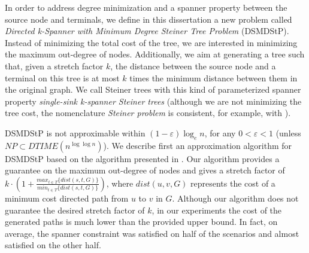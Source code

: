 In order to address degree minimization and a spanner property between the source node and terminals, we define in this dissertation a new problem called
\emph{Directed k-Spanner with Minimum Degree Steiner Tree Problem} (DSMDStP). Instead of minimizing 
the total cost of the tree, we are interested in minimizing the maximum out-degree of nodes. 
Additionally, we aim at generating a tree such that, given a stretch factor $k$, the distance between the source node and a terminal on this tree
is at most $k$ times the minimum distance between them in the original graph. 
We call Steiner trees with this kind of parameterized spanner property \emph{single-sink k-spanner Steiner trees} 
(although we are not minimizing the tree cost, the nomenclature \emph{Steiner problem} is consistent, for example, with \cite{Fraigniaud2001}). 

DSMDStP is not approximable within $(1-\varepsilon)\log_e{n}$, for any $0 < \varepsilon < 1$ (unless $NP \subset DTIME(n^{\log \log{n}})$).
We describe first an approximation algorithm for DSMDStP based on the algorithm presented in \cite{Elkin2006}. Our algorithm provides a guarantee on the 
maximum out-degree of nodes and gives a stretch factor of $k \cdot \left(1 + \frac{max_{t\in T}\{dist(s,t,G)\}}{min_{t \in T}\{dist(s,t,G)\}}\right)$, 
where %
$dist(u,v,G)$ represents the cost of a minimum cost directed path from $u$ to $v$ in $G$.
Although our algorithm does not guarantee the desired stretch factor of $k$, 
in our experiments the cost of the generated paths is much lower than the provided upper bound. In fact, on average,
the spanner constraint was satisfied on half of the scenarios and almost satisfied on the other half. 

